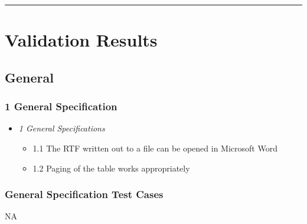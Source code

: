 \documentclass[]{article}
\providecommand{\tightlist}{%
  \setlength{\itemsep}{0pt}\setlength{\parskip}{0pt}}
\begin{document}
\begin{center}\rule{0.5\linewidth}{0.5pt}\end{center}

\hypertarget{validation-results}{%
\section{Validation Results}\label{validation-results}}

\hypertarget{general}{%
\subsection{General}\label{general}}

\hypertarget{general-specification}{%
\subsubsection{1 General Specification}\label{general-specification}}

\begin{itemize}
\tightlist
\item
  \emph{1 General Specifications}

  \begin{itemize}
  \tightlist
  \item
    1.1 The RTF written out to a file can be opened in Microsoft Word
  \item
    1.2 Paging of the table works appropriately
  \end{itemize}
\end{itemize}

\hypertarget{general-specification-test-cases}{%
\subsubsection{General Specification Test
Cases}\label{general-specification-test-cases}}

NA
\end{document}
